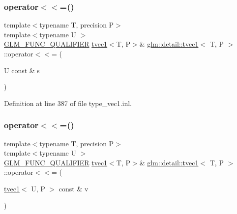 \mbox{\label{structglm_1_1detail_1_1tvec1_a7ff4b3a808e1ef7000ad8d41d7a428bb}} 
\subsubsection{\texorpdfstring{operator$<$$<$=()}{operator<<=()}\hspace{0.1cm}{\footnotesize\ttfamily [3/4]}}
{\footnotesize\ttfamily template$<$typename T, precision P$>$ \\
template$<$typename U $>$ \\
\hyperlink{setup_8hpp_a33fdea6f91c5f834105f7415e2a64407}{G\+L\+M\+\_\+\+F\+U\+N\+C\+\_\+\+Q\+U\+A\+L\+I\+F\+I\+ER} \hyperlink{structglm_1_1detail_1_1tvec1}{tvec1}$<$T, P$>$\& \hyperlink{structglm_1_1detail_1_1tvec1}{glm\+::detail\+::tvec1}$<$ T, P $>$\+::operator$<$$<$= (\begin{DoxyParamCaption}\item[{U const \&}]{s }\end{DoxyParamCaption})}



Definition at line 387 of file type\+\_\+vec1.\+inl.

\mbox{\label{structglm_1_1detail_1_1tvec1_a61fb7165bc6cf2c741e7aea9af680e60}} 
\subsubsection{\texorpdfstring{operator$<$$<$=()}{operator<<=()}\hspace{0.1cm}{\footnotesize\ttfamily [4/4]}}
{\footnotesize\ttfamily template$<$typename T, precision P$>$ \\
template$<$typename U $>$ \\
\hyperlink{setup_8hpp_a33fdea6f91c5f834105f7415e2a64407}{G\+L\+M\+\_\+\+F\+U\+N\+C\+\_\+\+Q\+U\+A\+L\+I\+F\+I\+ER} \hyperlink{structglm_1_1detail_1_1tvec1}{tvec1}$<$T, P$>$\& \hyperlink{structglm_1_1detail_1_1tvec1}{glm\+::detail\+::tvec1}$<$ T, P $>$\+::operator$<$$<$= (\begin{DoxyParamCaption}\item[{\hyperlink{structglm_1_1detail_1_1tvec1}{tvec1}$<$ U, P $>$ const \&}]{v }\end{DoxyParamCaption})}



